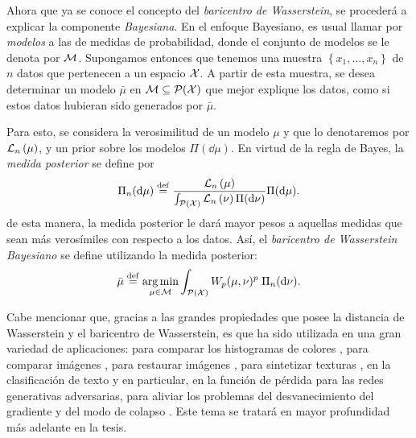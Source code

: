 Ahora que ya se conoce el concepto del \emph{baricentro de Wasserstein}, se procederá a explicar la componente \emph{Bayesiana}. En el enfoque Bayesiano, es usual llamar por \emph{modelos} a las de medidas de probabilidad, donde el conjunto de modelos se le denota por $\Models$.  Supongamos entonces que tenemos una muestra $\left\{ x_1, \ldots, x_n \right\}$ de $n$ datos que pertenecen a un espacio $\cX$.
A partir de esta muestra, se desea determinar un modelo $\bar{\mu}$ en $\Models\subseteq \ProbSpace[\cX]$ que mejor explique los datos, como si estos datos hubieran sido generados por $\bar{\mu}$.

Para esto, se considera la verosimilitud de un modelo $\mu$ y que lo denotaremos por $\LikelihoodN[\mu]$, y un prior sobre los modelos $\Pi(\dd \mu)$. En virtud de la regla de Bayes, la \emph{medida posterior} se define por
\begin{equation}
    \Pi_n(\dd \mu) \eqdef \frac{\LikelihoodN[\mu]}{\int_{\ProbSpace[\cX]} \LikelihoodN[\nu] \Pi(\dd \nu)} \Pi(\dd \mu).
\end{equation}
de esta manera, la medida posterior le dará mayor pesos a aquellas medidas que sean más verosímiles con respecto a los datos. Así, el \emph{baricentro de Wasserstein Bayesiano} se define utilizando la medida posterior:
\begin{equation}
    \bar\mu \eqdef \argmin_{\mu \in \Models} \int_{\ProbSpace[\cX]} \Wasserstein[p]{\mu}{\nu}^p \; {\Pi_n(\dd \nu)}.
\end{equation}


Cabe mencionar que, gracias a las grandes propiedades que posee la distancia de Wasserstein y el baricentro de Wasserstein, es que ha sido utilizada en una gran variedad de aplicaciones:
para comparar los histogramas de colores \cite{rubner1998metric}, para comparar imágenes \cite{peleg1989unified}, para restaurar imágenes \cite{lellmann2014imaging}, para sintetizar texturas \cite{tartavel2016wasserstein}, en la clasificación de texto \cite{kusner2015word} y en particular,
en la función de pérdida para las redes generativas adversarias, para aliviar los problemas del desvanecimiento del gradiente y del modo de colapso \cite{arjovsky2017wasserstein}. Este tema se tratará en mayor profundidad más adelante en la tesis.

